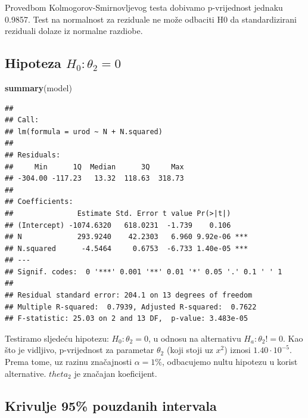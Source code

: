 \documentclass[]{article}
\newenvironment{Shaded}{\begin{snugshade}}{\end{snugshade}}
\newcommand{\KeywordTok}[1]{\textcolor[rgb]{0.13,0.29,0.53}{\textbf{{#1}}}}
\newcommand{\NormalTok}[1]{{#1}}
\begin{document}
Provedbom Kolmogorov-Smirnovljevog testa dobivamo p-vrijednost jednaku
0.9857. Test na normalnost za reziduale ne može odbaciti H0 da
standardizirani reziduali dolaze iz normalne razdiobe.

\subsection{\texorpdfstring{Hipoteza
\(H_0 : \theta_2 = 0\)}{Hipoteza H\_0 : \textbackslash{}theta\_2 = 0}}\label{hipoteza-h_0-theta_2-0}

\begin{Shaded}
\begin{Highlighting}[]
\KeywordTok{summary}\NormalTok{(model)}
\end{Highlighting}
\end{Shaded}

\begin{verbatim}
## 
## Call:
## lm(formula = urod ~ N + N.squared)
## 
## Residuals:
##     Min      1Q  Median      3Q     Max 
## -304.00 -117.23   13.32  118.63  318.73 
## 
## Coefficients:
##               Estimate Std. Error t value Pr(>|t|)    
## (Intercept) -1074.6320   618.0231  -1.739    0.106    
## N             293.9240    42.2303   6.960 9.92e-06 ***
## N.squared      -4.5464     0.6753  -6.733 1.40e-05 ***
## ---
## Signif. codes:  0 '***' 0.001 '**' 0.01 '*' 0.05 '.' 0.1 ' ' 1
## 
## Residual standard error: 204.1 on 13 degrees of freedom
## Multiple R-squared:  0.7939, Adjusted R-squared:  0.7622 
## F-statistic: 25.03 on 2 and 13 DF,  p-value: 3.483e-05
\end{verbatim}

Testiramo sljedeću hipotezu: \(H_0 : \theta_2 = 0\), u odnosu na
alternativu \(H_a : \theta_2 != 0\). Kao što je vidljivo, p-vrijednost
za parametar \(\theta_2\) (koji stoji uz \(x^2\)) iznosi
\(1.40 \cdot 10^{-5}\). Prema tome, uz razinu značajnosti
\(\alpha=1\%\), odbacujemo nultu hipotezu u korist alternative.
\(theta_2\) je značajan koeficijent.

\subsection{Krivulje 95\% pouzdanih
intervala}\label{krivulje-95-pouzdanih-intervala-1}
\end{document}
